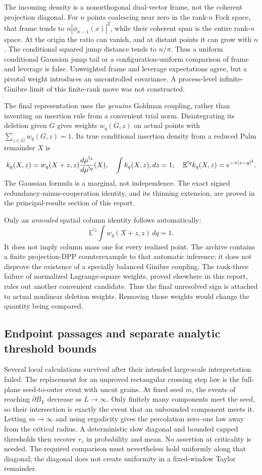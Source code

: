 \documentclass[11pt,a4paper]{article}
\theoremstyle{definition}
\theoremstyle{remark}
\numberwithin{equation}{section}
\begin{document}
The incoming density is a nonorthogonal dual-vector frame, not the
coherent projection diagonal.  For $n$ points coalescing near zero in
the rank-$n$ Fock space, that frame tends to
$n|\phi_{n-1}(x)|^2$, while their coherent span is the entire rank-$n$
space.  At the origin the ratio can vanish, and at distant points it
can grow with $n$.  The conditional squared jump distance tends to
$n/\pi$.  Thus a uniform conditional Gaussian jump tail or a
configuration-uniform comparison of frame and leverage is false.
Unweighted frame and leverage expectations agree, but a pivotal weight
introduces an uncontrolled covariance.  A process-level
infinite-Ginibre limit of this finite-rank move was not constructed.

The final representation uses the \emph{genuine} Goldman coupling,
rather than inventing an insertion rule from a convenient trial norm.
Disintegrating its deletion given $G$ gives weights $w_q(G,z)$ on actual
points with $\sum_{z\in G}w_q(G,z)=1$.  Its true conditional insertion
density from a reduced Palm remainder $X$ is
\[
 k_q(X,z)=w_q(X+z,z)\frac{d\mu^{!z}}{d\mu^{!q}}(X),
 \quad
 \int k_q(X,z)\\,dz=1,
 \quad
 \mathbb E^{!q}k_q(X,z)=e^{-\pi|z-q|^2}.
\]
The Gaussian formula is a marginal, not independence.  The exact
signed redundancy-minus-cooperation identity, and its thinning
extension, are proved in the principal-results section of this report.

Only an \emph{annealed} spatial column identity follows automatically:
\[
 \mathbb E^{!z}\int w_q(X+z,z)\,dq=1.
\]
It does not imply column mass one for every realized point.  The archive
contains a finite projection-DPP counterexample to that automatic
inference; it does not disprove the existence of a specially balanced
Ginibre coupling.  The rank-three failure of normalized Lagrange-square
weights, proved elsewhere in this report, rules out another convenient
candidate.  Thus the final unresolved sign is attached to actual
nonlinear deletion weights.  Removing those weights would change the
quantity being compared.

\subsection{Endpoint passages and separate analytic threshold bounds}
\label{br:endpoints}

Several local calculations survived after their intended large-scale
interpretation failed.  The replacement for an unproved rectangular
crossing step law is the full-plane seed-to-outer event with uncut
grains.  At fixed seed $m$, the events of reaching $\partial B_L$
decrease as $L\to\infty$.  Only finitely many components meet the seed,
so their intersection is exactly the event that an unbounded component
meets it.  Letting $m\to\infty$ and using ergodicity gives the
percolation zero--one law away from the critical radius.  A deterministic
slow diagonal and bounded capped thresholds then recover $r_c$ in
probability and mean.  No assertion at criticality is needed.  The
required comparison must nevertheless hold uniformly along that
diagonal; the diagonal does not create uniformity in a fixed-window
Taylor remainder.
\end{document}
